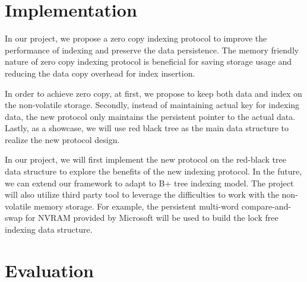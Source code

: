 \section{Implementation}
In our project, we propose a zero copy indexing protocol to improve the performance of indexing and preserve the data persistence. The memory friendly nature of zero copy indexing protocol is beneficial for saving storage usage and reducing the data copy overhead for index insertion. 

In order to achieve zero copy, at first, we propose to keep both data and index on the non-volatile storage. Secondly, instead of maintaining actual key for indexing data, the new protocol only maintains the persistent pointer to the actual data. Lastly, as a showcase, we will use red black tree as the main data structure to realize the new protocol design.

In our project, we will first implement the new protocol on the red-black tree data structure to explore the benefits of the new indexing protocol. In the future, we can extend our framework to adapt to B+ tree indexing model. The project will also utilize third party tool to leverage the difficulties to work with the non-volatile memory storage. For example, the persistent multi-word compare-and-swap for NVRAM provided by Microsoft will be used to build the lock free indexing data structure. 

\section{Evaluation}


